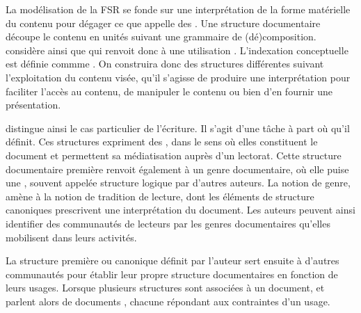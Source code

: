 La modélisation de la FSR se fonde sur une interprétation de la forme matérielle du contenu pour dégager ce que \cite{Prie2000} appelle des .
Une structure documentaire découpe le contenu en unités suivant une grammaire de (dé)composition.
\citeauthor{Prie2000} considère ainsi que  qui renvoit donc à une utilisation .
L'indexation conceptuelle est définie commme .
On construira donc des structures différentes suivant l'exploitation du contenu visée, qu'il s'agisse de produire une interprétation pour faciliter l'accès au contenu, de manipuler le contenu ou bien d'en fournir une présentation. 

\citeauthor{Prie2000} distingue ainsi le cas particulier de l'écriture.
Il s'agit d'une tâche à part où  qu'il définit. 
Ces structures expriment des , dans le sens où elles constituent le document et permettent sa médiatisation auprès d'un lectorat.
Cette structure documentaire première renvoit également à un genre documentaire, où elle puise une , souvent appelée structure logique par d'autres auteurs.
La notion de genre, amène à la notion de tradition de lecture, dont les éléments de structure canoniques prescrivent une interprétation du document.
Les auteurs peuvent ainsi identifier des communautés de lecteurs par les genres documentaires qu'elles mobilisent dans leurs activités.

La structure première ou canonique définit par l'auteur sert ensuite à d'autres communautés pour établir leur propre structure documentaires en fonction de leurs usages.
Lorsque plusieurs structures sont associées à un document, \cite{Abascal2003} et \cite{Abascal2004} parlent alors de documents , chacune répondant aux contraintes d'un usage.

